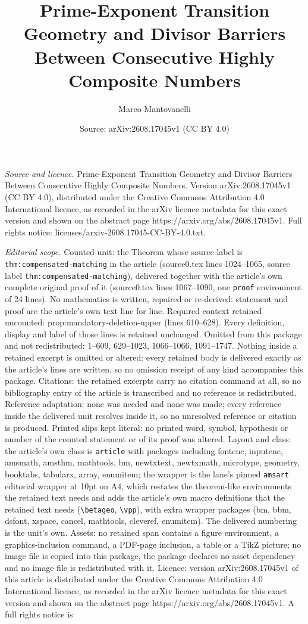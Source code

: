 \documentclass[10pt,a4paper]{amsart}
\title[Prime-Exponent Transition Geometry and Divisor Barriers Betw]{Prime-Exponent Transition Geometry and Divisor Barriers Between Consecutive Highly Composite Numbers}
\author{Marco Mantovanelli}
\date{Source: arXiv:2608.17045v1 (CC BY 4.0)}
\begin{document}
\maketitle

\noindent\emph{Source and licence.} Prime-Exponent Transition Geometry and Divisor Barriers Between Consecutive Highly Composite Numbers. Version arXiv:2608.17045v1 (CC BY 4.0), distributed under the Creative Commons Attribution 4.0 International licence, as recorded in the arXiv licence metadata for this exact version and shown on the abstract page https://arxiv.org/abs/2608.17045v1. Full rights notice: licenses/arxiv-2608.17045-CC-BY-4.0.txt.\par\smallskip

\noindent\textit{Editorial scope.} Counted unit: the Theorem whose source label is \texttt{thm:compensated-matching} in the article (source0.tex lines 1024--1065, source label \texttt{thm:compensated-matching}), delivered together with the article's own complete original proof of it (source0.tex lines 1067--1090, one \texttt{proof} environment of 24 lines). No mathematics is written, repaired or re-derived: statement and proof are the article's own text line for line. Required context retained uncounted: prop:mandatory-deletion-upper (lines 610--628). Every definition, display and label of those lines is retained unchanged. Omitted from this package and not redistributed: 1--609, 629--1023, 1066--1066, 1091--1747. Nothing inside a retained excerpt is omitted or altered: every retained body is delivered exactly as the article's lines are written, so no omission receipt of any kind accompanies this package. Citations: the retained excerpts carry no citation command at all, so no bibliography entry of the article is transcribed and no reference is redistributed. Reference adaptation: none was needed and none was made; every reference inside the delivered unit resolves inside it, so no unresolved reference or citation is produced. Printed slips kept literal: no printed word, symbol, hypothesis or number of the counted statement or of its proof was altered. Layout and class: the article's own class is \texttt{article} with packages including fontenc, inputenc, amsmath, amsthm, mathtools, bm, newtxtext, newtxmath, microtype, geometry, booktabs, tabularx, array, enumitem; the wrapper is the lane's pinned \texttt{amsart} editorial wrapper at 10pt on A4, which restates the theorem-like environments the retained text needs and adds the article's own macro definitions that the retained text needs (\texttt{\textbackslash betageo}, \texttt{\textbackslash vpp}), with extra wrapper packages (bm, bbm, dsfont, xspace, cancel, mathtools, cleveref, enumitem). The delivered numbering is the unit's own. Assets: no retained span contains a figure environment, a graphics-inclusion command, a PDF-page inclusion, a table or a TikZ picture; no image file is copied into this package, the package declares no asset dependency and no image file is redistributed with it. Licence: version arXiv:2608.17045v1 of this article is distributed under the Creative Commons Attribution 4.0 International licence, as recorded in the arXiv licence metadata for this exact version and shown on the abstract page https://arxiv.org/abs/2608.17045v1. A full rights notice is 
\end{document}
